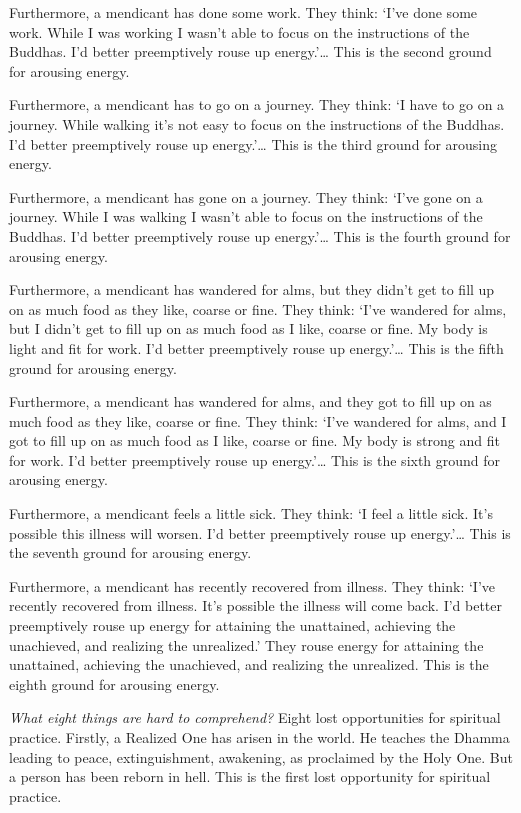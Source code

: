 \documentclass[12pt,openany]{book}%
\begin{document}
Furthermore, a mendicant has done some work. They think: ‘I’ve done some work. While I was working I wasn’t able to focus on the instructions of the Buddhas. I’d better preemptively rouse up energy.’… This is the second ground for arousing energy. 

Furthermore, a mendicant has to go on a journey. They think: ‘I have to go on a journey. While walking it’s not easy to focus on the instructions of the Buddhas. I’d better preemptively rouse up energy.’… This is the third ground for arousing energy. 

Furthermore, a mendicant has gone on a journey. They think: ‘I’ve gone on a journey. While I was walking I wasn’t able to focus on the instructions of the Buddhas. I’d better preemptively rouse up energy.’… This is the fourth ground for arousing energy. 

Furthermore, a mendicant has wandered for alms, but they didn’t get to fill up on as much food as they like, coarse or fine. They think: ‘I’ve wandered for alms, but I didn’t get to fill up on as much food as I like, coarse or fine. My body is light and fit for work. I’d better preemptively rouse up energy.’… This is the fifth ground for arousing energy. 

Furthermore, a mendicant has wandered for alms, and they got to fill up on as much food as they like, coarse or fine. They think: ‘I’ve wandered for alms, and I got to fill up on as much food as I like, coarse or fine. My body is strong and fit for work. I’d better preemptively rouse up energy.’… This is the sixth ground for arousing energy. 

Furthermore, a mendicant feels a little sick. They think: ‘I feel a little sick. It’s possible this illness will worsen. I’d better preemptively rouse up energy.’… This is the seventh ground for arousing energy. 

Furthermore, a mendicant has recently recovered from illness. They think: ‘I’ve recently recovered from illness. It’s possible the illness will come back. I’d better preemptively rouse up energy for attaining the unattained, achieving the unachieved, and realizing the unrealized.’ They rouse energy for attaining the unattained, achieving the unachieved, and realizing the unrealized. This is the eighth ground for arousing energy. 

\emph{What eight things are hard to comprehend?} Eight lost opportunities for spiritual practice. Firstly, a Realized One has arisen in the world. He teaches the Dhamma leading to peace, extinguishment, awakening, as proclaimed by the Holy One. But a person has been reborn in hell. This is the first lost opportunity for spiritual practice. 
\end{document}
